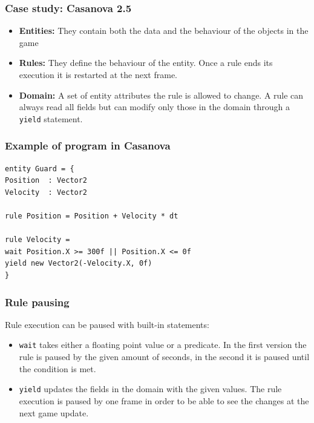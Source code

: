 \documentclass[mathserif,serif]{beamer}
\begin{document}
\begin{frame}
	\frametitle{Case study: Casanova 2.5}
	
	\begin{itemize}
		\item \textbf{Entities:} They contain both the data and the behaviour of the objects in the game
		\item \textbf{Rules:} They define the behaviour of the entity. Once a rule ends its execution it is restarted at the next frame.
		\item \textbf{Domain:} A set of entity attributes the rule is allowed to change. A rule can always read all fields but can modify only those in the domain through a \texttt{yield} statement.
	\end{itemize}
\end{frame}

\begin{frame}[fragile]
	\frametitle{Example of program in Casanova}
	\begin{lstlisting}[basicstyle = \ttfamily\small]
entity Guard = {
Position  : Vector2
Velocity  : Vector2

rule Position = Position + Velocity * dt

rule Velocity =
wait Position.X >= 300f || Position.X <= 0f
yield new Vector2(-Velocity.X, 0f)
}
	\end{lstlisting}
\end{frame}

\begin{frame}
	\frametitle{Rule pausing}
	Rule execution can be paused with built-in statements:
	\begin{itemize}
		\item \texttt{wait} takes either a floating point value or a predicate. In the first version the rule is paused by the given amount of seconds, in the second it is paused until the condition is met.
		\item \texttt{yield} updates the fields in the domain with the given values. The rule execution is paused by one frame in order to be able to see the changes at the next game update.
	\end{itemize}
\end{frame}
\end{document}
